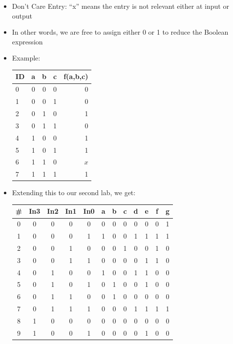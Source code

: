 \begin{itemize}

  \item Don't Care Entry: ``x'' means the entry is not relevant either at input or output

  \item In other words, we are free to assign either 0 or 1 to reduce the Boolean expression

  \item Example:

    \begin{center}
      \begin{tabular}[h!]{l | c c c | r}
        ID & a & b & c & f(a,b,c)\\
        \hline
        0 & 0 & 0 & 0 & 0\\
        1 & 0 & 0 & 1 & 0\\
        2 & 0 & 1 & 0 & 1\\
        3 & 0 & 1 & 1 & 0\\
        4 & 1 & 0 & 0 & 1\\
        5 & 1 & 0 & 1 & 1\\
        6 & 1 & 1 & 0 & $\boxed{x}$\\
        7 & 1 & 1 & 1 & 1\\
      \end{tabular}
    \end{center}

  \item Extending this to our second lab, we get:

\begin{center}
  \begin{tabular}[H]{| c || c | c | c | c || c | c | c | c | c | c | c |}
    \hline
    \# & In3 & In2 & In1 & In0 & a & b & c & d & e & f & g \\
    \hline
    0 & 0 & 0 & 0 & 0 & 0 & 0 & 0 & 0 & 0 & 0 & 1 \\
    \hline 
    1 & 0 & 0 & 0 & 1 & 1 & 0 & 0 & 1 & 1 & 1 & 1 \\
    \hline
    2 & 0 & 0 & 1 & 0 & 0 & 0 & 1 & 0 & 0 & 1 & 0 \\
    \hline
    3 & 0 & 0 & 1 & 1 & 0 & 0 & 0 & 0 & 1 & 1 & 0\\
    \hline
    4 & 0 & 1 & 0 & 0 & 1 & 0 & 0 & 1 & 1 & 0 & 0\\
    \hline
    5 & 0 & 1 & 0 & 1 & 0 & 1 & 0 & 0 & 1 & 0 & 0\\
    \hline
    6 & 0 & 1 & 1 & 0 & 0 & 1 & 0 & 0 & 0 & 0 & 0\\
    \hline
    7 & 0 & 1 & 1 & 1 & 0 & 0 & 0 & 1 & 1 & 1 & 1\\
    \hline
    8 & 1 & 0 & 0 & 0 & 0 & 0 & 0 & 0 & 0 & 0 & 0\\
    \hline
    9 & 1 & 0 & 0 & 1 & 0 & 0 & 0 & 0 & 1 & 0 & 0\\
    \hline
  \end{tabular}
\end{center}


\end{itemize}
